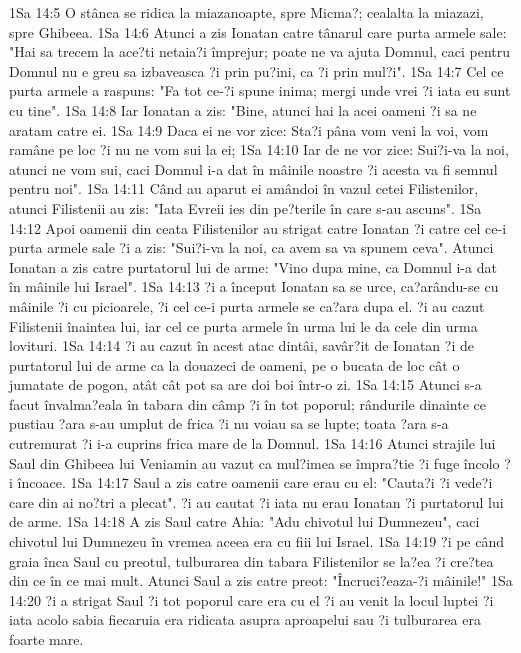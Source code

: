 1Sa 14:5  O stânca se ridica la miazanoapte, spre Micma?; cealalta la miazazi, spre Ghibeea.
1Sa 14:6  Atunci a zis Ionatan catre tânarul care purta armele sale: "Hai sa trecem la ace?ti netaia?i împrejur; poate ne va ajuta Domnul, caci pentru Domnul nu e greu sa izbaveasca ?i prin pu?ini, ca ?i prin mul?i".
1Sa 14:7  Cel ce purta armele a raspuns: "Fa tot ce-?i spune inima; mergi unde vrei ?i iata eu sunt cu tine".
1Sa 14:8  Iar Ionatan a zis: "Bine, atunci hai la acei oameni ?i sa ne aratam catre ei.
1Sa 14:9  Daca ei ne vor zice: Sta?i pâna vom veni la voi, vom ramâne pe loc ?i nu ne vom sui la ei;
1Sa 14:10  Iar de ne vor zice: Sui?i-va la noi, atunci ne vom sui, caci Domnul i-a dat în mâinile noastre ?i acesta va fi semnul pentru noi".
1Sa 14:11  Când au aparut ei amândoi în vazul cetei Filistenilor, atunci Filistenii au zis: "Iata Evreii ies din pe?terile în care s-au ascuns".
1Sa 14:12  Apoi oamenii din ceata Filistenilor au strigat catre Ionatan ?i catre cel ce-i purta armele sale ?i a zis: "Sui?i-va la noi, ca avem sa va spunem ceva". Atunci Ionatan a zis catre purtatorul lui de arme: "Vino dupa mine, ca Domnul i-a dat în mâinile lui Israel".
1Sa 14:13  ?i a început Ionatan sa se urce, ca?arându-se cu mâinile ?i cu picioarele, ?i cel ce-i purta armele se ca?ara dupa el. ?i au cazut Filistenii înaintea lui, iar cel ce purta armele în urma lui le da cele din urma lovituri.
1Sa 14:14  ?i au cazut în acest atac dintâi, savâr?it de Ionatan ?i de purtatorul lui de arme ca la douazeci de oameni, pe o bucata de loc cât o jumatate de pogon, atât cât pot sa are doi boi într-o zi.
1Sa 14:15  Atunci s-a facut învalma?eala în tabara din câmp ?i în tot poporul; rândurile dinainte ce pustiau ?ara s-au umplut de frica ?i nu voiau sa se lupte; toata ?ara s-a cutremurat ?i i-a cuprins frica mare de la Domnul.
1Sa 14:16  Atunci strajile lui Saul din Ghibeea lui Veniamin au vazut ca mul?imea se împra?tie ?i fuge încolo ?i încoace.
1Sa 14:17  Saul a zis catre oamenii care erau cu el: "Cauta?i ?i vede?i care din ai no?tri a plecat". ?i au cautat ?i iata nu erau Ionatan ?i purtatorul lui de arme.
1Sa 14:18  A zis Saul catre Ahia: "Adu chivotul lui Dumnezeu", caci chivotul lui Dumnezeu în vremea aceea era cu fiii lui Israel.
1Sa 14:19  ?i pe când graia înca Saul cu preotul, tulburarea din tabara Filistenilor se la?ea ?i cre?tea din ce în ce mai mult. Atunci Saul a zis catre preot: "Încruci?eaza-?i mâinile!"
1Sa 14:20  ?i a strigat Saul ?i tot poporul care era cu el ?i au venit la locul luptei ?i iata acolo sabia fiecaruia era ridicata asupra aproapelui sau ?i tulburarea era foarte mare.
